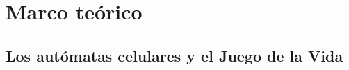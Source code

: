 \chapter{Marco teórico}
\label{chapter:marteo}

\section{Los autómatas celulares y el Juego de la Vida}
\label{section:autocel}
